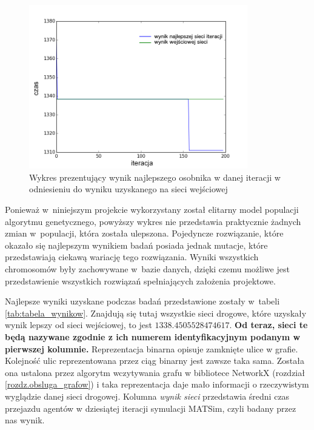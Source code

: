 \documentclass[twoside,12pt]{report}
\begin{document}
\begin{figure}[htbp]
	\centering
	\includegraphics[width=0.85\textwidth]{img/fitness}
	\caption{Wykres prezentujący wynik najlepszego osobnika w danej iteracji w odniesieniu do wyniku uzyskanego na sieci wejściowej}
	\label{fig:wynik_globalny}
\end{figure}

Ponieważ w~niniejszym projekcie wykorzystany został elitarny model populacji algorytmu genetycznego, powyższy wykres nie przedstawia praktycznie żadnych zmian w~populacji, która została ulepszona. Pojedyncze rozwiązanie, które okazało się najlepszym wynikiem badań posiada jednak  mutacje, które przedstawiają ciekawą wariację tego rozwiązania. Wyniki wszystkich chromosomów były  zachowywane w~bazie danych, dzięki czemu możliwe jest przedstawienie wszystkich rozwiązań spełniających założenia projektowe.

Najlepsze wyniki uzyskane podczas badań przedstawione zostały w~tabeli \ref{tab:tabela_wynikow}. Znajdują się tutaj wszystkie sieci drogowe, które uzyskały wynik lepszy od sieci wejściowej, to jest $1338.4505528474617$. \textbf{Od teraz, sieci te będą nazywane zgodnie z ich numerem identyfikacyjnym podanym w pierwszej kolumnie.} Reprezentacja binarna opisuje zamknięte ulice w grafie. Kolejność ulic reprezentowana przez ciąg binarny jest zawsze taka sama. Została ona ustalona przez algorytm wczytywania grafu w bibliotece NetworkX (rozdział \ref{rozdz.obsluga_grafow}) i taka reprezentacja daje mało informacji o rzeczywistym wyglądzie danej sieci drogowej. Kolumna \textit{wynik sieci} przedstawia średni czas przejazdu agentów w dziesiątej iteracji symulacji MATSim, czyli badany przez nas wynik.
\end{document}
